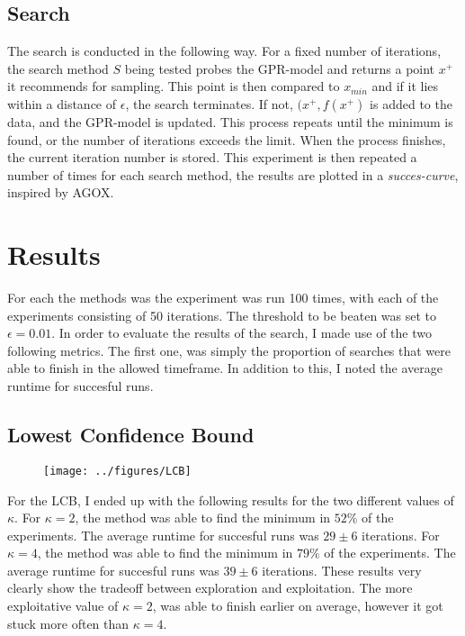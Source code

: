 \documentclass[working, oneside]{../../../Preambles/marginclass}
\begin{document}
\subsection{Search}
The search is conducted in the following way. For a fixed number of iterations, the search method $S$ being tested probes the GPR-model and returns a point $x^{+}$ it recommends for sampling. This point is then compared to $x_{min}$ and if it lies within a distance of $\epsilon$, the search terminates. If not, $(x^{+}, f(x^{+})$ is added to the data, and the GPR-model is updated. This process repeats until the minimum is found, or the number of iterations exceeds the limit. When the process finishes, the current iteration number is stored. 
This experiment is then repeated a number of times for each search method, the results are plotted in a \textit{succes-curve}, inspired by {AGOX}.

\newpage
{}
\section{Results}
For each the methods was the experiment was run 100 times, with each of the experiments consisting of 50 iterations. The threshold to be beaten was set to $\epsilon = 0.01$. In order to evaluate the results of the search, I made use of the two following metrics. The first one, was simply the proportion of searches that were able to finish in the allowed timeframe. In addition to this, I noted the average runtime for succesful runs.
\subsection{Lowest Confidence Bound}
\begin{figure}[htpb]
    \centering
    \texttt{[image: ../figures/LCB]}
    \label{fig:}
\end{figure}
\noindent
For the LCB, I ended up with the following results for the two different values of $\kappa$. For $\kappa = 2$, the method was able to find the minimum in $52\%$ of the experiments. The average runtime for succesful runs was $29 \pm 6$ iterations. For $\kappa = 4$, the method was able to find the minimum in $79\%$ of the experiments. The average runtime for succesful runs was $39 \pm 6$ iterations. These results very clearly show the tradeoff between exploration and exploitation. The more exploitative value of $\kappa = 2$, was able to finish earlier on average, however it got stuck more often than $\kappa = 4$.
\end{document}
